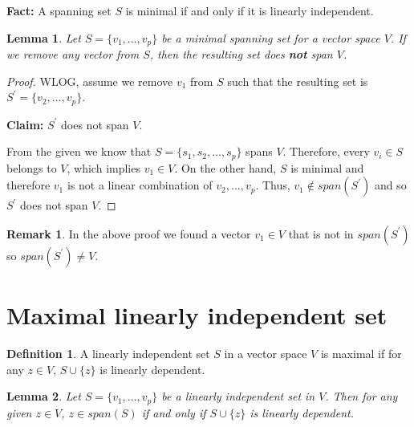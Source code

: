 \documentclass[12pt]{article}
\newtheorem*{lemma}{Lemma}
\theoremstyle{definition}
\newtheorem*{definition}{Definition}
\newtheorem*{remark}{Remark}
\begin{document}
\noindent \textbf{Fact:} A spanning set $S$ is minimal if and only if it is linearly independent.

\begin{lemma}
Let $S = \{v_1, \ldots, v_p \}$ be a minimal spanning set for a vector space $V$. If we
remove any vector from $S$, then the resulting set does \textbf{not} span $V$.
\end{lemma}

\begin{proof}
WLOG, assume we remove $v_1$ from $S$ such that the resulting set is 
$S^{\prime} = \{ v_2, \ldots, v_p \}$.

\textbf{Claim:} $S^{\prime}$ does not span $V$.

From the given we know that $S = \{s_1, s_2, \ldots, s_p\}$ spans $V$. Therefore, every
$v_i \in S$ belongs to $V$, which implies $v_1 \in V$. On the other hand, $S$ is minimal
and therefore $v_1$ is not a linear combination of $v_2, \ldots, v_p$. Thus, 
$v_1 \notin span(S^{\prime})$ and so $S^{\prime}$ does not span $V$.

\end{proof}


\begin{remark} 
In the above proof we found a vector $v_1 \in V$ that is not in 
$span(S^{\prime})$ so $span(S^{\prime}) \neq V$.
\end{remark}


\section{Maximal linearly independent set}

\begin{definition}
A linearly independent set $S$ in a vector space $V$ is maximal if for any
$z \in V$, $S \cup \{z\}$ is linearly dependent.
\end{definition}

\begin{lemma}
Let $S = \{v_1, \ldots, v_p \}$ be a linearly independent set in $V$. Then for any
given $z \in V$, $z \in span(S)$ if and only if $S \cup \{ z \}$ is linearly
dependent.
\end{lemma}
\end{document}
